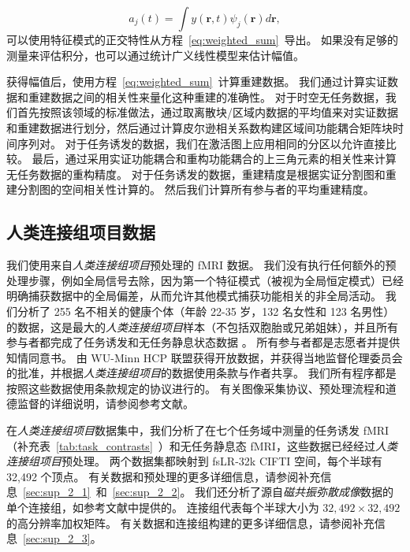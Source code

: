 \documentclass[lang=cn,a4paper,newtx,citestyle=gb7714-2015, bibstyle=gb7714-2015]{elegantpaper}
\begin{document}
\begin{equation}\label{eq:amplitudes}
	a_j(t) = \int y(\textbf{r}, t) \psi_j(\textbf{r}) d\textbf{r}, 
\end{equation}
可以使用特征模式的正交特性从方程~\ref{eq:weighted_sum}~导出\cite{robinson2021determination,courant2008methods}。
如果没有足够的测量来评估积分，也可以通过统计广义线性模型来估计幅值。


获得幅值后，使用方程~\ref{eq:weighted_sum}~计算重建数据。
我们通过计算实证数据和重建数据之间的相关性来量化这种重建的准确性。
对于时空无任务数据，我们首先按照该领域的标准做法，通过取离散块/区域内数据的平均值来对实证数据和重建数据进行划分\cite{eickhoff2018imaging}，然后通过计算皮尔逊相关系数构建区域间功能耦合矩阵块时间序列对。
对于任务诱发的数据，我们在激活图上应用相同的分区以允许直接比较。
最后，通过采用实证功能耦合和重构功能耦合的上三角元素的相关性来计算无任务数据的重构精度。
对于任务诱发的数据，重建精度是根据实证分割图和重建分割图的空间相关性计算的。
然后我们计算所有参与者的平均重建精度。



\subsection{人类连接组项目数据} \label{sec:HCP_data}

我们使用来自\textit{人类连接组项目}\cite{van2013wu}预处理的 fMRI 数据。
我们没有执行任何额外的预处理步骤，例如全局信号去除，因为第一个特征模式（被视为全局恒定模式）已经明确捕获数据中的全局偏差，从而允许其他模式捕获功能相关的非全局活动。
我们分析了 255 名不相关的健康个体（年龄 22-35 岁，132 名女性和 123 名男性）的数据，这是最大的\textit{人类连接组项目}样本（不包括双胞胎或兄弟姐妹），并且所有参与者都完成了任务诱发和无任务静息状态数据 。
所有参与者都是志愿者并提供知情同意书。
由 WU-Minn HCP 联盟获得开放数据，并获得当地监督伦理委员会的批准，并根据\textit{人类连接组项目}的数据使用条款与作者共享。
我们所有程序都是按照这些数据使用条款规定的协议进行的。
有关图像采集协议、预处理流程和道德监督的详细说明，请参阅参考文献\cite{van2013wu,barch2013function}。


在\textit{人类连接组项目}数据集中，我们分析了在七个任务域中测量的任务诱发 fMRI（补充表~\ref{tab:task_contrasts}~）和无任务静息态 fMRI，这些数据已经经过\textit{人类连接组项目}预处理。
两个数据集都映射到 fsLR-32k CIFTI 空间，每个半球有 32,492 个顶点。
有关数据和预处理的更多详细信息，请参阅补充信息~\ref{sec:sup_2_1}~和~\ref{sec:sup_2_2}。
我们还分析了源自\textit{磁共振弥散成像}数据的单个连接组，如参考文献中提供的\cite{tian2021high}。
连接组代表每个半球大小为 $ 32,492 \times 32,492 $ 的高分辨率加权矩阵。
有关数据和连接组构建的更多详细信息，请参阅补充信息~\ref{sec:sup_2_3}。
\end{document}
